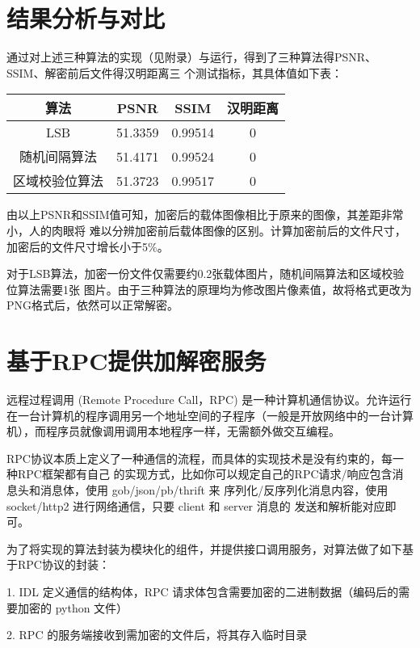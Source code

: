 \documentclass[a4paper,zihao=5,UTF8]{ctexart}
\begin{document}
\section{结果分析与对比}

通过对上述三种算法的实现（见附录）与运行，得到了三种算法得PSNR、SSIM、解密前后文件得汉明距离三
个测试指标，其具体值如下表：

\begin{center}
    \begin{tabular}{cccc}
        \toprule %
        算法 & PSNR & SSIM & 汉明距离 \\
        \midrule %
        LSB & 51.3359 & 0.99514 & 0 \\
        随机间隔算法 & 51.4171 & 0.99524 & 0 \\
        区域校验位算法 & 51.3723 & 0.99517 & 0 \\
        \bottomrule %
    \end{tabular}
\end{center}

由以上PSNR和SSIM值可知，加密后的载体图像相比于原来的图像，其差距非常小，人的肉眼将
难以分辨加密前后载体图像的区别。计算加密前后的文件尺寸，加密后的文件尺寸增长小于5\%。

对于LSB算法，加密一份文件仅需要约0.2张载体图片，随机间隔算法和区域校验位算法需要1张
图片。由于三种算法的原理均为修改图片像素值，故将格式更改为PNG格式后，依然可以正常解密。

\section{基于RPC提供加解密服务}

远程过程调用 (Remote Procedure Call，RPC) 是一种计算机通信协议。允许运行在一台计算机的程序调用另一个地址空间的子程序（一般是开放网络中的一台计算机），而程序员就像调用调用本地程序一样，无需额外做交互编程。

RPC协议本质上定义了一种通信的流程，而具体的实现技术是没有约束的，每一种RPC框架都有自己
的实现方式，比如你可以规定自己的RPC请求/响应包含消息头和消息体，使用 gob/json/pb/thrift 来
序列化/反序列化消息内容，使用 socket/http2 进行网络通信，只要 client 和 server 消息的
发送和解析能对应即可。

为了将实现的算法封装为模块化的组件，并提供接口调用服务，对算法做了如下基于RPC协议的封装：

1. IDL 定义通信的结构体，RPC 请求体包含需要加密的二进制数据（编码后的需要加密的 python 文件）

2. RPC 的服务端接收到需加密的文件后，将其存入临时目录
\end{document}
